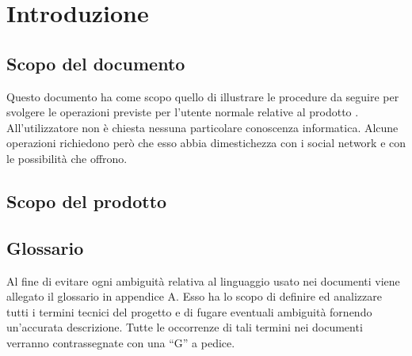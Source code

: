 %


\section{Introduzione} %
\label{sec:introduzione}


	\subsection{Scopo del documento} %
	\label{sub:scopo_del_documento}
		Questo documento ha come scopo quello di illustrare le procedure da seguire per svolgere le operazioni previste per l'utente normale relative al prodotto \projectName. All'utilizzatore non è chiesta nessuna particolare conoscenza informatica. Alcune operazioni richiedono però che esso abbia dimestichezza con i social network e con le possibilità che offrono.


	\subsection{Scopo del prodotto} %
	\label{sub:scopo_del_prodotto}
		\productScope


	\subsection{Glossario} %
	\label{sub:glossario}
		Al fine di evitare ogni ambiguità relativa al linguaggio usato nei documenti viene allegato il glossario in appendice A.\newline
		Esso ha lo scopo di definire ed analizzare tutti i termini tecnici del progetto e di fugare eventuali ambiguità fornendo un'accurata descrizione.\newline
		Tutte le occorrenze di tali termini nei documenti verranno contrassegnate con una ``G'' a pedice.


